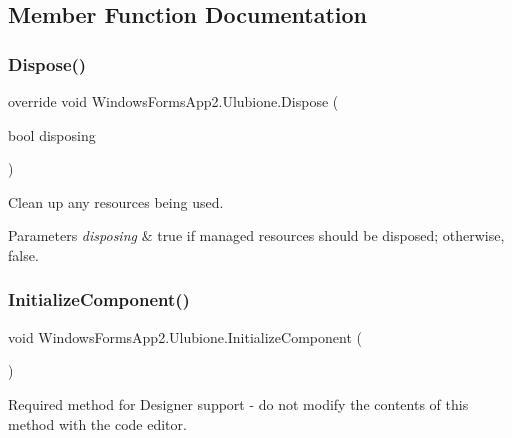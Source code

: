 \subsection{Member Function Documentation}
\mbox{\label{class_windows_forms_app2_1_1_ulubione_a114b27b249c5a38d47009008fbba7ecb}} 
\subsubsection{\texorpdfstring{Dispose()}{Dispose()}}
{\footnotesize\ttfamily override void Windows\+Forms\+App2.\+Ulubione.\+Dispose (\begin{DoxyParamCaption}\item[{bool}]{disposing }\end{DoxyParamCaption})\hspace{0.3cm}{\ttfamily [protected]}}



Clean up any resources being used. 


\begin{DoxyParams}{Parameters}
{\em disposing} & true if managed resources should be disposed; otherwise, false.\\
\hline
\end{DoxyParams}
\mbox{\label{class_windows_forms_app2_1_1_ulubione_a3f4798b6ad5b38e969020d292d104e55}} 
\subsubsection{\texorpdfstring{Initialize\+Component()}{InitializeComponent()}}
{\footnotesize\ttfamily void Windows\+Forms\+App2.\+Ulubione.\+Initialize\+Component (\begin{DoxyParamCaption}{ }\end{DoxyParamCaption})\hspace{0.3cm}{\ttfamily [private]}}



Required method for Designer support -\/ do not modify the contents of this method with the code editor. 



